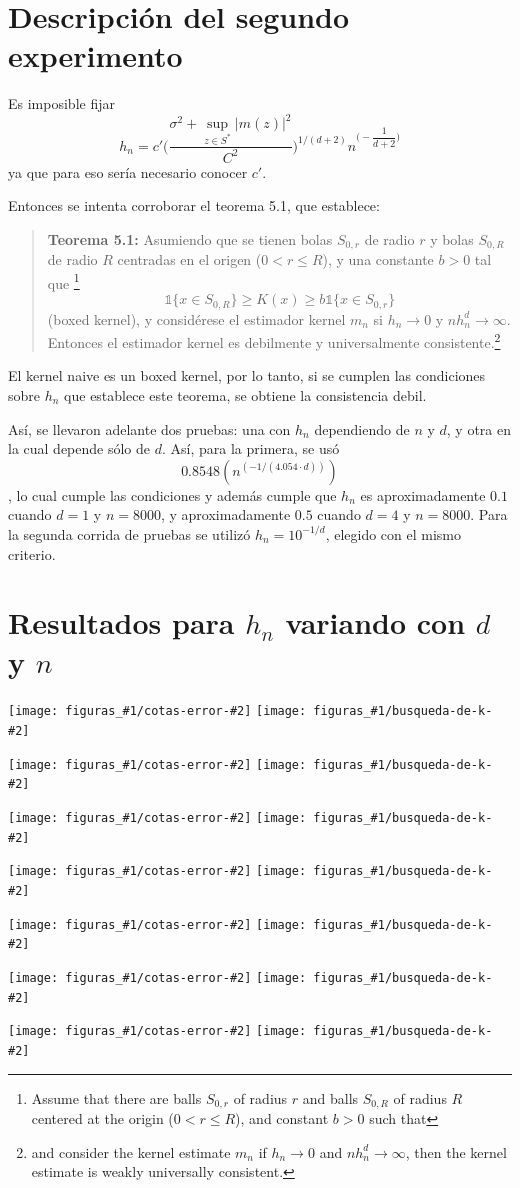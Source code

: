 \documentclass[12pt, a4paper]{article}
\newcommand{\imagenesDH}[2]{
  \texttt{[image: figuras\_\#1/cotas-error-\#2]}
  \texttt{[image: figuras\_\#1/busqueda-de-k-\#2]}
}
\begin{document}
\section{Descripción del segundo experimento}

Es imposible fijar 
$$
h_n = c' \Bigg( \dfrac{\sigma^2 + \mathop{sup}_{z\in S^{*}}|m(z)|^2 }{C^2} \Bigg)^{1/(d+2)} n^{\Big (-\dfrac{1}{d+2}\Big )}
$$
ya que para eso sería necesario conocer $c'$.

Entonces se intenta corroborar el teorema 5.1, que establece:

\begin{quotation}
\textbf{Teorema 5.1:} Asumiendo que se tienen bolas $S_{0,r}$ de radio $r$ y bolas $S_{0,R}$ de radio $R$ centradas en el origen ($0 < r\leq R$), y una constante $b>0$ tal que \footnote{ Assume that there are balls $S_{0,r}$ of radius $r$ and balls $S_{0,R}$ of radius $R$ centered at the origin ($0 < r\leq R$), and constant $b>0$ such that }
$$
\mathds{1}\{x\in S_{0,R}\}\geq K(x) \geq b \mathds{1}\{x\in S_{0,r}\}
$$
(boxed kernel), y considérese el estimador kernel $m_n$ si $h_n \rightarrow 0$ y $n h_n^d \rightarrow \infty$. Entonces el estimador kernel es debilmente y universalmente consistente.\footnote{and consider the kernel estimate $m_n$ if $h_n \rightarrow 0$ and $n h_n^d \rightarrow \infty$, then the kernel estimate is weakly universally consistent.}
\end{quotation}

El kernel naive es un boxed kernel, por lo tanto, si se cumplen las condiciones sobre $h_n$ que establece este teorema, se obtiene la consistencia debil.

Así, se llevaron adelante dos pruebas: una con $h_n$ dependiendo de $n$ y $d$, y otra en la cual depende sólo de $d$. Así, para la primera, se usó $$ 0.8548 (n^{(-1/(4.054 \cdot d))}) $$, lo cual cumple las condiciones y además cumple que $h_n$ es aproximadamente $0.1$ cuando $d=1$ y $n=8000$, y aproximadamente $0.5$ cuando $d=4$ y $n=8000$. Para la segunda corrida de pruebas se utilizó $h_n=10^{-1/d}$, elegido con el mismo criterio.

\section{Resultados para $h_n$ variando con $d$ y $n$}


\imagenesDH{h_dinamico}{d=1}
\imagenesDH{h_dinamico}{d=2}
\imagenesDH{h_dinamico}{d=3}
\imagenesDH{h_dinamico}{d=4}
\imagenesDH{h_dinamico}{d=6}
\imagenesDH{h_dinamico}{d=8}
\imagenesDH{h_dinamico}{d=10}
\end{document}
